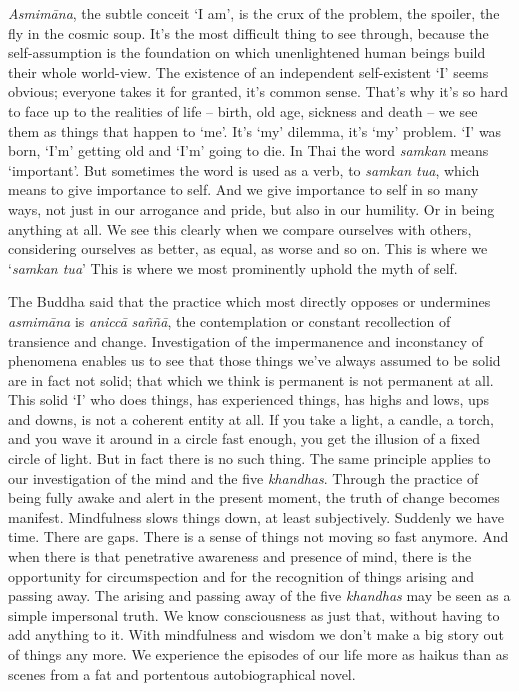 \emph{Asmimāna}, the subtle conceit `I am', is the crux of the problem,
the spoiler, the fly in the cosmic soup. It's the most difficult thing
to see through, because the self-assumption is the foundation on which
unenlightened human beings build their whole world-view. The existence
of an independent self-existent `I' seems obvious; everyone takes it for
granted, it's common sense. That's why it's so hard to face up to the
realities of life -- birth, old age, sickness and death -- we see them
as things that happen to `me'. It's `my' dilemma, it's `my' problem. `I'
was born, `I'm' getting old and `I'm' going to die. In Thai the word
\emph{samkan} means `important'. But sometimes the word is used as a
verb, to \emph{samkan tua}, which means to give importance to self. And
we give importance to self in so many ways, not just in our arrogance
and pride, but also in our humility. Or in being anything at all. We see
this clearly when we compare ourselves with others, considering
ourselves as better, as equal, as worse and so on. This is where we
`\emph{samkan tua}' This is where we most prominently uphold the myth of
self.

The Buddha said that the practice which most directly opposes or
undermines \emph{asmimāna} is \emph{aniccā} \emph{saññā}, the
contemplation or constant recollection of transience and change.
Investigation of the impermanence and inconstancy of phenomena enables
us to see that those things we've always assumed to be solid are in fact
not solid; that which we think is permanent is not permanent at all.
This solid `I' who does things, has experienced things, has highs and
lows, ups and downs, is not a coherent entity at all. If you take a
light, a candle, a torch, and you wave it around in a circle fast
enough, you get the illusion of a fixed circle of light. But in fact
there is no such thing. The same principle applies to our investigation
of the mind and the five \emph{khandhas}. Through the practice of being
fully awake and alert in the present moment, the truth of change becomes
manifest. Mindfulness slows things down, at least subjectively. Suddenly
we have time. There are gaps. There is a sense of things not moving so
fast anymore. And when there is that penetrative awareness and presence
of mind, there is the opportunity for circumspection and for the
recognition of things arising and passing away. The arising and passing
away of the five \emph{khandhas} may be seen as a simple impersonal
truth. We know consciousness as just that, without having to add
anything to it. With mindfulness and wisdom we don't make a big story
out of things any more. We experience the episodes of our life more as
haikus than as scenes from a fat and portentous autobiographical novel.

